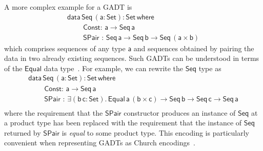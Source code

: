 \documentclass[acmsmall,screen,review,anonymous]{acmart}
\theoremstyle{definition}
\begin{document}
A more complex example for a GADT is
\begin{equation}\label{eq:eq-seq}
\begin{array}{l}
\mathsf{data\, Seq\,(a : Set) : Set\,where}\\
\mathsf{\;\;\;\;\;\;\;\;Const :\, a \to Seq\,a}\\
\mathsf{\;\;\;\;\;\;\;\;SPair\,\, :\, Seq \,a \to Seq\,b \to
  Seq\,(a \times b)}
\end{array}
\end{equation}
which comprises sequences of any type $\mathsf{a}$
and sequences obtained by pairing the data in two already existing sequences.
Such GADTs can be understood in terms of the $\mathsf{Equal}$ data type~\cite{ch03,sp04}.
For example, we can rewrite the $\mathsf{Seq}$ type as
\begin{equation}\label{eq:eq_seq}
\begin{array}{l}
\mathsf{data\, Seq\,(a : Set) : Set\,where}\\
\mathsf{\;\;\;\;\;\;\;\;Const :\, a \to Seq\,a}\\
\mathsf{\;\;\;\;\;\;\;\;SPair\,\, :\, \exists (b\,c : Set).\,Equal\,a\,(b \times c) \to Seq\,b \to Seq\,c \to
  Seq\,a}\\ 
\end{array}
\end{equation}
where the requirement that the $\mathsf{SPair}$ constructor produces an instance of $\mathsf{Seq}$ at a product type has been replaced with the requirement that the instance of $\mathsf{Seq}$ returned by $\mathsf{SPair}$ is \emph{equal} to some product type.
This encoding is particularly convenient when representing GADTs as Church encodings~\cite{vw10,atk12}.




\end{document}
